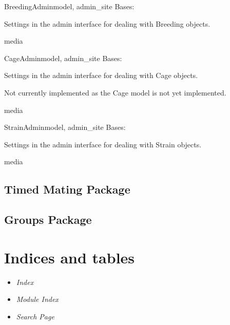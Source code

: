 \documentclass[letterpaper,10pt,english]{sphinxmanual}
\begin{document}
\hypertarget{animal.admin.BreedingAdmin}{}\begin{classdesc}{BreedingAdmin}{model, admin\_site}
Bases: 

Settings in the admin interface for dealing with Breeding objects.

\hypertarget{animal.admin.BreedingAdmin.media}{}\begin{memberdesc}{media}\end{memberdesc}
\end{classdesc}

\hypertarget{animal.admin.CageAdmin}{}\begin{classdesc}{CageAdmin}{model, admin\_site}
Bases: 

Settings in the admin interface for dealing with Cage objects.

Not currently implemented as the Cage model is not yet implemented.

\hypertarget{animal.admin.CageAdmin.media}{}\begin{memberdesc}{media}\end{memberdesc}
\end{classdesc}

\hypertarget{animal.admin.StrainAdmin}{}\begin{classdesc}{StrainAdmin}{model, admin\_site}
Bases: 

Settings in the admin interface for dealing with Strain objects.

\hypertarget{animal.admin.StrainAdmin.media}{}\begin{memberdesc}{media}\end{memberdesc}
\end{classdesc}


\section{Timed Mating Package}
\hypertarget{module-timed_mating}{}
\modulesynopsis{}

\section{Groups Package}
\hypertarget{module-groups}{}
\modulesynopsis{}

\chapter{Indices and tables}
\begin{itemize}
\item {} 
\emph{Index}

\item {} 
\emph{Module Index}

\item {} 
\emph{Search Page}

\end{itemize}


\renewcommand{\indexname}{Module Index}
\printmodindex
\renewcommand{\indexname}{Index}
\printindex
\end{document}
